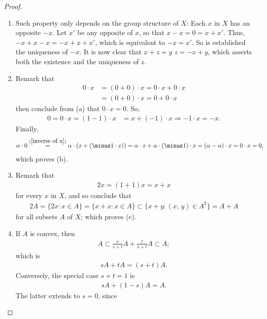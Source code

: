 \begin{proof}
\begin{enumerate}
\item Such property only depends on the group structure of $X$: Each $x$ in
$X$ has an opposite $\minus x$. Let $x'$ be any opposite of $x$, so that
${x-x=0}=x+x'$. %
Thus, $\minus x +x -x =  \minus x + x + x' $, %
which is equivalent to $\minus x = x'$. So is established the uniqueness of %
$\minus x $. %
%
It is now clear that $x+z=y$ \iif $z=\minus x +y$, %
which asserts both the existence and the uniqueness of $z$.
\item Remark that %
%
\begin{align}
  0\cdot x & =(0+0)\cdot x=0\cdot x+0\cdot x \\
           & =(0+0)\cdot x=0 +0\cdot x 
\end{align} 
%
then conclude from (a) that $0\cdot x=0$. So, %
\begin{align} \label{inverse of x}
  0=0\cdot x=(1-1)\cdot x &=x+(\minus 1)\cdot x
  \Rightarrow \minus 1\cdot x= \minus x.
\end{align}
%
Finally, %
%
\begin{align}
  \alpha\cdot 0\overset{(\ref{inverse of x})}{=}
  \alpha\cdot (x+(\minus 1\cdot x))
  = \alpha \cdot x + \alpha \cdot (\minus 1) \cdot x 
  = (\alpha-\alpha )  \cdot x =0\cdot x = 0,
\end{align}
%
which proves (b).
%
\item Remark that 
%
\begin{align}
  2x =(1+1) x = x + x
\end{align}
%
for every $x$ in $X$, and so conclude that %
%
\begin{align}\label{double lies in sum}
  2A = \{2x: x\in A \} 
  = \{x + x: x \in A \} 
  \subset \{ x + y : (x,\,y) \in A^2 \} 
  = A+A
\end{align}
%
for all subsets $A$ of $X$; which proves (c). %
\item If $A$ is convex, then %
%
\begin{align}
  A \subset \frac{s}{s+t} A + \frac{t}{s+t} A \subset A;
\end{align}
%
which is %
%
\begin{align}
  sA + tA = (s+t)A.
\end{align}
%
Conversely, the special case $s+t=1$ is %
%
\begin{align}
  sA + (1-s)A = A.
\end{align}
%
The latter extends to $s=0$, since %
%

\end{enumerate}
\end{proof}
